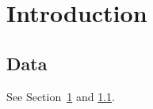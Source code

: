 \documentclass{aastex701}
\begin{document}
\section{Introduction}\label{s:i}
\subsection{Data}\label{s:d}
See Section~\ref{s:i} and \ref{s:d}.
\end{document}
